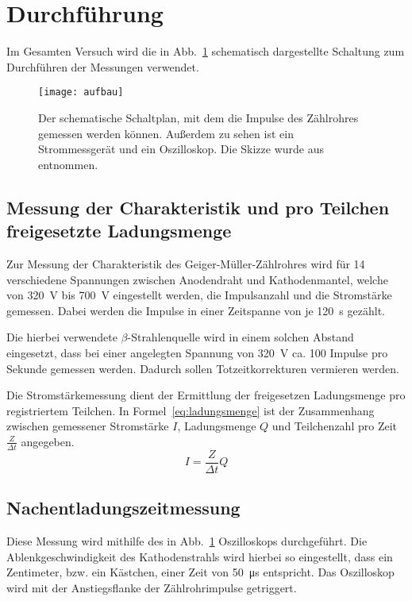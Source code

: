 
\newpage
\section{Durchführung}
%
Im Gesamten Versuch wird die in Abb.~\ref{fig:aufbau} schematisch 
dargestellte Schaltung zum Durchführen der Messungen verwendet.
%
\begin{figure}
  \centering
  \texttt{[image: aufbau]}
  \caption{Der schematische Schaltplan, mit dem die Impulse
               des Zählrohres gemessen werden können. Außerdem zu sehen 
                ist ein Strommessgerät und ein Oszilloskop.
                 Die Skizze wurde aus \textcite{v703} entnommen.}
  \label{fig:aufbau}
\end{figure}
%
\subsection{Messung der Charakteristik und pro Teilchen freigesetzte Ladungsmenge}
%
Zur Messung der Charakteristik des Geiger-Müller-Zählrohres wird für
\num{14} verschiedene Spannungen zwischen Anodendraht und
Kathodenmantel, welche von \SI{320}{\volt} bis \SI{700}{\volt}
eingestellt werden, die Impulsanzahl und die Stromstärke gemessen.
Dabei werden die Impulse in einer Zeitspanne von je \SI{120}{\second}
gezählt.

Die hierbei verwendete $\beta$-Strahlenquelle wird in einem solchen
Abstand eingesetzt, dass bei einer angelegten Spannung von
\SI{320}{\volt} ca. \num{100} Impulse pro Sekunde gemessen
werden. Dadurch sollen Totzeitkorrekturen vermieren werden.

Die Stromstärkemessung dient der Ermittlung der freigesetzen
Ladungsmenge pro registriertem Teilchen. In
Formel~\eqref{eq:ladungsmenge} ist der Zusammenhang zwischen gemessener
Stromstärke $I$, Ladungsmenge $Q$ und Teilchenzahl pro Zeit
$\frac{Z}{\Delta t}$ angegeben.
\begin{equation}
I = \frac{Z}{\Delta t} Q
\label{eq:ladungsmenge}
\end{equation}
%
\subsection{Nachentladungszeitmessung}
%
Diese Messung wird mithilfe des in Abb.~\ref{fig:aufbau} Oszilloskops
durchgeführt. Die Ablenkgeschwindigkeit des Kathodenstrahls wird hierbei
so eingestellt, dass ein Zentimeter, bzw. ein Kästchen, einer Zeit von
\SI{50}{\micro\second} entspricht. Das Oszilloskop wird mit der
Anstiegsflanke der Zählrohrimpulse getriggert.

